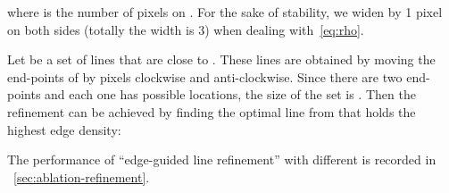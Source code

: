 \documentclass[10pt,journal,cspaper,compsoc]{IEEEtran}
\newcommand{\CheckRmv}[1]{}
\newcommand{\CheckRmv}[1]{#1}
\begin{document}
where  is the number of pixels on .
For the sake of stability, we widen  by 1 pixel on both sides (totally the width is 3)
when dealing with~\cref{eq:rho}.

Let  be a set of lines that are close to .
These lines are obtained by moving the end-points of  by  pixels clockwise
and anti-clockwise.
Since there are two end-points and each one has
 possible locations, the size of the set is .
Then the refinement can be achieved by finding the optimal line  from 
that holds the highest edge density:

The performance of ``edge-guided line refinement'' with different 
is recorded in ~\cref{sec:ablation-refinement}.



\CheckRmv{
\begin{figure*}[tb!]
  \centering
  \subfigure[]{
    \begin{overpic}[width=.19\linewidth]{figures/metric_analysis_1.pdf}
      \put(54,66){m}
      \put(74,32){n}
      \put(10,50){p}
      \put(7,25){q}
      \put(19,10){{IOU(m,n)=0.66}}
      \put(20,0){{IOU(p,q)=0.95}}
    \end{overpic}\label{fig:metric_a}
    }
  \hfill
  \subfigure[]{
    \begin{overpic}[width=.19\linewidth]{figures/metric_analysis_2.pdf}
      \put(18,10){{IOU(red)=0.53}}
      \put(16.5,0){{IOU(blue)=0.46}}
    \end{overpic}\label{fig:metric_b}
  }
  \hfill
  \subfigure[]{
    \begin{overpic}[width=.19\linewidth]{figures/metric_analysis_3.pdf}
      \put(54,66){m}
      \put(74,32){n}
      \put(10,50){p}
      \put(7,25){q}
\put(22,10){{(m,n)=0.24}}
      \put(23,0){{(p,q)=0.34}}
    \end{overpic}\label{fig:metric_c}
  }
  \hfill
  \subfigure[]{
    \begin{overpic}[width=.19\linewidth]{figures/metric_analysis_4.pdf}
      \put(16,10){{=0.54, =0.02}}
      \put(28.5,0){{=0.00}}
    \end{overpic}\label{fig:metric_d}
  }\vspace{-10pt}
  \caption{
    (a): Two pairs of lines with similar relative position could have very
        different IOU scores.
(b): Even humans cannot determine which area (blue or red) should be considered as
    the intersection in the IOU-based metric~\cite{lee2017semantic}.
(c) and (d): Our proposed metric considers both Euclidean distance and angular distance
        between a pair of lines, resulting in consistent and reasonable scores.
Best viewed in color.
  }
  \label{fig:metric_analysis}
\end{figure*}
}
\end{document}
